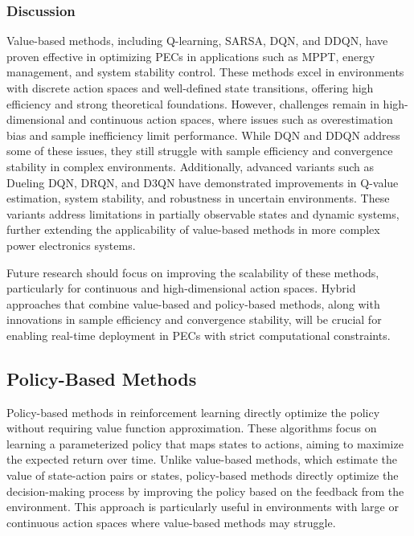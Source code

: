 
\subsubsection{Discussion}

Value-based methods, including Q-learning, SARSA, DQN, and DDQN, have proven effective in optimizing PECs in applications such as MPPT, energy management, and system stability control. These methods excel in environments with discrete action spaces and well-defined state transitions, offering high efficiency and strong theoretical foundations. However, challenges remain in high-dimensional and continuous action spaces, where issues such as overestimation bias and sample inefficiency limit performance. While DQN and DDQN address some of these issues, they still struggle with sample efficiency and convergence stability in complex environments. Additionally, advanced variants such as Dueling DQN, DRQN, and D3QN have demonstrated improvements in Q-value estimation, system stability, and robustness in uncertain environments. These variants address limitations in partially observable states and dynamic systems, further extending the applicability of value-based methods in more complex power electronics systems.

Future research should focus on improving the scalability of these methods, particularly for continuous and high-dimensional action spaces. Hybrid approaches that combine value-based and policy-based methods, along with innovations in sample efficiency and convergence stability, will be crucial for enabling real-time deployment in PECs with strict computational constraints.

\subsection{Policy-Based Methods}
\label{sec:pol_methods}

Policy-based methods in reinforcement learning directly optimize the policy without requiring value function approximation. These algorithms focus on learning a parameterized policy that maps states to actions, aiming to maximize the expected return over time. Unlike value-based methods, which estimate the value of state-action pairs or states, policy-based methods directly optimize the decision-making process by improving the policy based on the feedback from the environment. This approach is particularly useful in environments with large or continuous action spaces where value-based methods may struggle.

